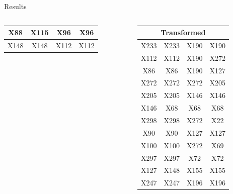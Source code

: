 \documentclass[final]{beamer} %
\newcommand{\boz}{\cellcolor{pathwaynode}}
\newcommand{\ghool}{\cellcolor{independentnode}}
\begin{document}
\begin{frame}{}
\begin{block}{Results}
\begin{columns}
\begin{column}{0.25\textwidth}
\begin{columns}
\begin{column}{0.5\textwidth}
\begin{tabular}{| c c || c c |}
                \ghool X88   &  X115 &
                \ghool X96   &  \ghool X96  \\ \hline
                \boz X148   &  \boz X148 &
                X112   &  X112  \\ \hline
              \end{tabular}
            \end{column}
            \begin{column}{0.5\textwidth}
              \center
              \tiny
              \begin{tabular}{| c c || c c |}
                \hline
                \toprule
                \multicolumn{4}{c}{Transformed} \\ 
                \midrule \hline
                X233   &  X233  &
                \boz X190   &  \boz X190  \\ \hline
                X112   &  X112  &
                \boz X190   &  \boz X272  \\ \hline
                X86   &  X86  &
                \boz X190   &  X127  \\ \hline
                \boz X272   &  \boz X272 &
                \boz X272   &  X205  \\ \hline
                X205   &  X205  &
                X146   &  X146  \\ \hline
                X146   &  X68  &
                X68   &  X68  \\ \hline
                X298   &  X298  &
                \boz X272   &  \boz X22  \\ \hline
                X90   &  X90  &
                X127   &  X127  \\ \hline
                X100   &  X100  &
                \boz X272   &  X69  \\ \hline
                X297   &  X297  &
                X72   &  X72  \\ \hline
                X127   &  \boz X148 &
                X155   &  X155  \\ \hline
                X247   &  X247  &
                X196   &  X196  \\ \hline
              \end{tabular}
            \end{column}
          \end{columns}
        \end{column}


\end{columns}
\end{block}
\end{frame}
\end{document}
